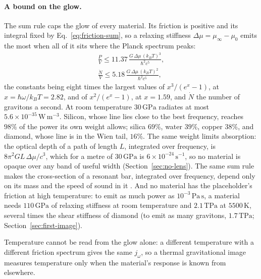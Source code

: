 \paragraph{A bound on the glow.} The sum rule caps the glow of every
material. Its friction is positive and its integral fixed by
Eq.~\eqref{eq:friction-sum}, so a relaxing stiffness $\Delta\mu = \mu_\infty - \mu_0$
emits the most when all of it sits where the Planck spectrum peaks:
\begin{equation}\label{eq:glow-bound}
\begin{gathered}
\frac{P}{V} \le 11.37\,\frac{G\,\Delta\mu\,(k_BT)^3}{\hbar^2c^5},\\
\frac{\dot N}{V} \le 5.18\,\frac{G\,\Delta\mu\,(k_BT)^2}{\hbar^2c^5},
\end{gathered}
\end{equation}
the constants being eight times the largest values of $x^3/(e^x - 1)$, at
$x = \hbar\omega/k_BT = 2.82$, and of $x^2/(e^x - 1)$, at $x = 1.59$, and
$\dot N$ the number of gravitons a second. At room
temperature $30\,\mathrm{GPa}$ radiates at most
$5.6\times10^{-35}\,\mathrm{W\,m^{-3}}$. Silicon, whose line lies close to the
best frequency, reaches $98\%$ of the power its own weight allows; silica
$69\%$, water $39\%$, copper $38\%$, and diamond, whose line is in the Wien
tail, $16\%$. The same weight limits absorption: the optical depth of a path of
length $L$, integrated over frequency, is $8\pi^2GL\,\Delta\mu/c^3$, which for a
metre of $30\,\mathrm{GPa}$ is $6\times10^{-24}\,\mathrm{s^{-1}}$, so no material
is opaque over any band of useful width (Section~\ref{sec:no-lens}). The same sum
rule makes the cross-section of a resonant bar, integrated over frequency,
depend only on its mass and the speed of sound in it
\cite{MisnerThorneWheeler1973}. And no material has the placeholder's friction
at high temperature: to emit as much power
as $10^{-3}\,\mathrm{Pa\,s}$, a material needs $110\,\mathrm{GPa}$ of relaxing
stiffness at room temperature and $2.1\,\mathrm{TPa}$ at $5500\,\mathrm{K}$,
several times the shear stiffness of diamond (to emit as many gravitons, $1.7\,\mathrm{TPa}$; Section~\ref{sec:first-image}).

Temperature
cannot be read from the glow alone: a different temperature with a different
friction spectrum gives the same $j_\omega$, so a thermal gravitational image
measures temperature only when the material's response is known from elsewhere.

